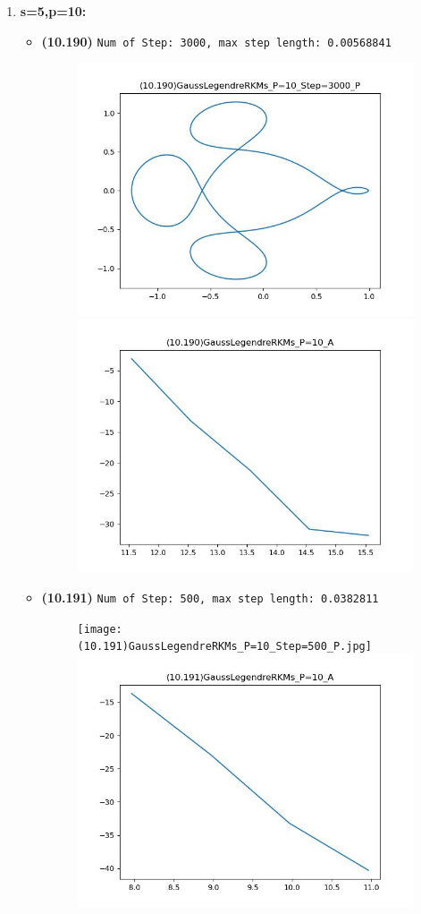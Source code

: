 \documentclass{article}
\begin{document}
\begin{enumerate}
    \item \textbf{s=5,p=10:}
    \begin{itemize}
        \item \textbf{(10.190)} \verb|Num of Step: 3000, max step length: 0.00568841|
        \begin{figure}[h]
            \centering
            \includegraphics[width = 0.45\linewidth]{(10.190)GaussLegendreRKMs_P=10_Step=3000_P.jpg}
            \includegraphics[width = 0.45\linewidth]{(10.190)GaussLegendreRKMs_P=10_A.jpg}
        \end{figure}
        \item \textbf{(10.191)} \verb|Num of Step: 500, max step length: 0.0382811|
        \begin{figure}[h]
            \centering
            \texttt{[image: (10.191)GaussLegendreRKMs\_P=10\_Step=500\_P.jpg]}
            \includegraphics[width = 0.45\linewidth]{(10.191)GaussLegendreRKMs_P=10_A.jpg}
        \end{figure}
    \end{itemize}
    
\end{enumerate}
\end{document}
